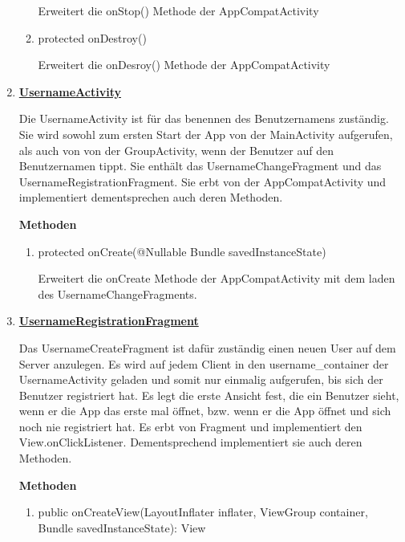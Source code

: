 \begin{enumerate}
\begin{enumerate}
		Erweitert die onStop() Methode der AppCompatActivity %
		
		\item protected onDestroy()

		Erweitert die onDesroy() Methode der AppCompatActivity %
	\end{enumerate}
	
	\item \textbf{\underline{UsernameActivity}}
	
	Die UsernameActivity ist für das benennen des Benutzernamens zuständig. Sie wird sowohl zum ersten Start der App von der MainActivity aufgerufen, als auch von von der GroupActivity, wenn der Benutzer auf den Benutzernamen tippt. Sie enthält das UsernameChangeFragment und das UsernameRegistrationFragment. Sie erbt von der AppCompatActivity und implementiert dementsprechen auch deren Methoden.
	
	\textbf{Methoden}
	
	\begin{enumerate}
		\item protected onCreate(@Nullable Bundle savedInstanceState)
		
		Erweitert die onCreate Methode der AppCompatActivity mit dem laden des UsernameChangeFragments.
	\end{enumerate}
	
	\item \textbf{\underline{UsernameRegistrationFragment}}
	
	Das UsernameCreateFragment ist dafür zuständig einen neuen User auf dem Server anzulegen. Es wird auf jedem Client in den username\_container der UsernameActivity geladen und somit nur einmalig aufgerufen, bis sich der Benutzer registriert hat. Es legt die erste Ansicht fest, die ein Benutzer sieht, wenn er die App das erste mal öffnet, bzw. wenn er die App öffnet und sich noch nie registriert hat. Es erbt von Fragment und implementiert den View.onClickListener. Dementsprechend implementiert sie auch deren Methoden.
	
	\textbf{Methoden}
	
	\begin{enumerate}
		\item public onCreateView(LayoutInflater inflater, ViewGroup container, Bundle savedInstanceState): View


\end{enumerate}
\end{enumerate}
